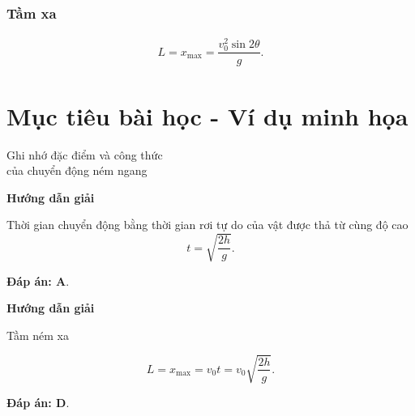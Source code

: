 \subsubsection{Tầm xa}
		\vspace{-0.5cm}
		\begin{align*}
			L = x_{\max} = \dfrac{v_0^2 \sin 2\theta}{g}.
		\end{align*}
	



\section{Mục tiêu bài học - Ví dụ minh họa}
\begin{dang}{Ghi nhớ đặc điểm và công thức \\ của chuyển động ném ngang}
	{	\begin{center}
			\textbf{Hướng dẫn giải}
		\end{center}
		
		Thời gian chuyển động bằng thời gian rơi tự do của vật được thả từ cùng độ cao
		\begin{equation*}
			t=\sqrt{\dfrac{2h}{g}}.
		\end{equation*}
		
		\textbf{Đáp án: A}.
	}
	{	\begin{center}
			\textbf{Hướng dẫn giải}
		\end{center}
		
		Tầm ném xa
		
		\begin{equation*}
			L = x_{\text{max}} = v_0 t = v_0 \sqrt{\dfrac{2h}{g}}.
		\end{equation*}
		
		\textbf{Đáp án: D}.
	}
\end{dang}
